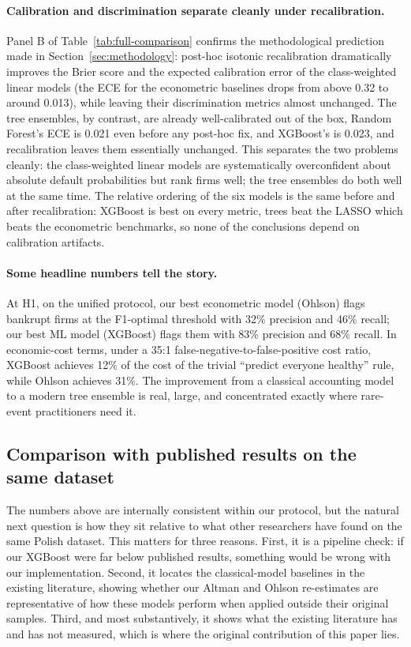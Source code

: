 \documentclass[12pt,a4paper]{article}
\begin{document}
\paragraph{Calibration and discrimination separate cleanly under
recalibration.} Panel B of Table~\ref{tab:full-comparison} confirms the
methodological prediction made in Section~\ref{sec:methodology}: post-hoc
isotonic recalibration dramatically improves the Brier score and the
expected calibration error of the class-weighted linear models (the ECE for
the econometric baselines drops from above 0.32 to around 0.013), while
leaving their discrimination metrics almost unchanged. The tree ensembles,
by contrast, are already well-calibrated out of the box, Random Forest's
ECE is 0.021 even before any post-hoc fix, and XGBoost's is 0.023, and
recalibration leaves them essentially unchanged. This separates the two
problems cleanly: the class-weighted linear models are systematically
overconfident about absolute default probabilities but rank firms well;
the tree ensembles do both well at the same time. The relative ordering of the six models is the same before and after
recalibration: XGBoost is best on every metric, trees beat the LASSO which
beats the econometric benchmarks, so none of the conclusions depend on
calibration artifacts.

\paragraph{Some headline numbers tell the story.} At H1, on the unified
protocol, our best econometric model (Ohlson) flags bankrupt firms at the
F1-optimal threshold with 32\% precision and 46\% recall; our best ML model
(XGBoost) flags them with 83\% precision and 68\% recall. In economic-cost
terms, under a 35:1 false-negative-to-false-positive cost ratio, XGBoost
achieves 12\% of the cost of the trivial ``predict everyone healthy'' rule,
while Ohlson achieves 31\%. The improvement from a classical accounting
model to a modern tree ensemble is real, large, and concentrated exactly
where rare-event practitioners need it.

\subsection{Comparison with published results on the same dataset}
\label{sec:litbenchmark}

The numbers above are internally consistent within our protocol, but the natural
next question is how they sit relative to what other researchers have found on
the same Polish dataset. This matters for three reasons. First, it is a pipeline
check: if our XGBoost were far below published results, something would be wrong
with our implementation. Second, it locates the classical-model baselines in the
existing literature, showing whether our Altman and Ohlson re-estimates are
representative of how these models perform when applied outside their original
samples. Third, and most substantively, it shows what the existing literature
has and has not measured, which is where the original contribution of this paper
lies.
\end{document}

